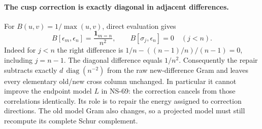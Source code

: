 \documentclass[11pt]{article}
\theoremstyle{remark}
\begin{document}
\paragraph{The cusp correction is exactly diagonal in adjacent differences.}
For $B(u,v)=1/\max(u,v)$, direct evaluation gives
\[
 B[\epsilon_m,\epsilon_n]=\frac{\mathbf1_{m=n}}{n^2},
 \qquad B[\sigma_j,\epsilon_n]=0\quad(j<n).
\]
Indeed for $j<n$ the right difference is
$1/n-((n-1)/n)/(n-1)=0$, including $j=n-1$.
The diagonal difference equals $1/n^2$. Consequently the repair
subtracts exactly $d\,\operatorname{diag}(n^{-2})$ from the raw
new-difference Gram and leaves every elementary old/new cross column
unchanged. In particular it cannot improve the endpoint model $L$
in NS-69: the correction cancels from those correlations identically.
Its role is to repair the energy assigned to correction directions.
The old model Gram also changes, so a projected model must still
recompute its complete Schur complement.
\end{document}
